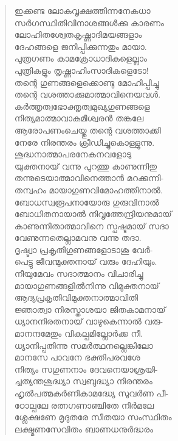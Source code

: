 \begin{verse}
ഇക്കണ്ട ലോകവൃക്ഷത്തിന്നനേകധാ\\
സര്‍ഗസ്ഥിതിവിനാശങ്ങള്‍ക്കു കാരണം\\
ലോഹിതശ്വേതകൃഷ്ണാദിമയങ്ങളാം\\
ദേഹങ്ങളെ ജനിപ്പിക്കുന്നതും മായാ.\\
പുത്രഗണം കാമക്രോധാദികളെല്ലാം\\
പുത്രികളും തൃഷ്ണാഹിംസാദികളെടോ!\\
തന്റെ ഗുണങ്ങളെക്കൊണ്ടു മോഹിപ്പിച്ചു\\
തന്റെ വശത്താക്കുമാത്മാവിനെയവള്‍.\\
കര്‍ത്തൃത്വഭോക്തൃത്വമുഖ്യഗുണങ്ങളെ\\
നിത്യമാത്മാവാകുമീശ്വരന്‍ തങ്കലേ\\
ആരോപണംചെയ്തു തന്റെ വശത്താക്കി\\
നേരേ നിരന്തരം ക്രീഡിച്ചുകൊള്ളുന്നു.\\
ശുദ്ധനാത്മാപരനേകനവളോടു\\
യുക്തനായ് വന്നു പുറത്തു കാണുന്നിതു\\
തന്നുടെയാത്മാവിനെത്താന്‍ മറക്കുന്നി-\\
തന്വഹം മായാഗുണവിമോഹത്തിനാല്‍.\\
ബോധസ്വരൂപനായോരു ഗുരുവിനാല്‍\\
ബോധിതനായാല്‍ നിവൃത്തേന്ദ്രിയനുമായ്\\
കാണുന്നിതാത്മാവിനെ സ്പഷ്ടമായ് സദാ\\
വേണുന്നതെല്ലാമവനു വന്നു തദാ.\\
ദൃഷ്ട്വാ പ്രകൃതിഗുണങ്ങളോടാശു വേര്‍-\\
പെട്ടു ജീവന്മുക്തനായ് വരും ദേഹിയും.\\
നീയുമേവം സദാത്മാനം വിചാരിച്ചു\\
മായാഗുണങ്ങളില്‍നിന്നു വിമുക്തനായ്\\
ആദ്യപ്രകൃതിവിമുക്തനാത്മാവിതി\\
ജ്ഞാത്വാ നിരസ്താശയാ ജിതകാമനായ്\\
ധ്യാനനിരതനായ് വാഴുകെന്നാല്‍ വരു-\\
മാനന്ദമേതും വികല്പമില്ലോര്‍ക്ക നീ.\\
ധ്യാനിപ്പതിന്നു സമര്‍ത്ഥനല്ലെങ്കിലോ\\
മാനസേ പാവനേ ഭക്തിപരവശേ\\
നിത്യം സഗുണനാം ദേവനെയാശ്രയി-\\
ച്ചത്യന്തശുദ്ധ്യാ സ്വബുദ്ധ്യാ നിരന്തരം\\
ഹൃല്‍പത്മകര്‍ണികാമദ്ധ്യേ സുവര്‍ണ പീ-\\
ഠോല്പലേ രത്നഗണാഞ്ചിതേ നിര്‍മലേ\\
ശ്ലേക്ഷണേ മൃദുതരേ സീതയാ സംസ്ഥിതം\\
ലക്ഷ്മണസേവിതം ബാണധനുര്‍ദ്ധരം\\

\end{verse}
